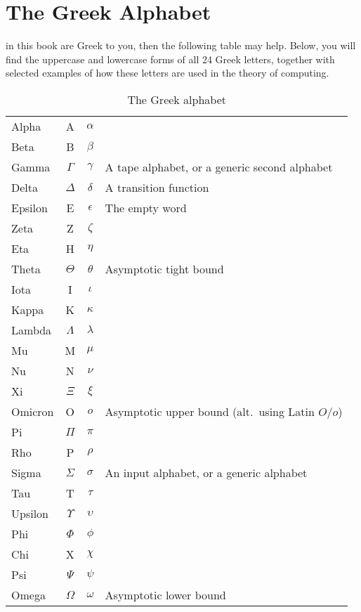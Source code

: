 \chapter{The Greek Alphabet}\label{app:greekalphabet}

 in this book are Greek to you, then the following table may help. Below, you will find the uppercase and lowercase forms of all 24 Greek letters, together with selected examples of how these letters are used in the theory of computing.

\begin{table}[h]
\centering
\caption{The Greek alphabet}
\begin{tabular}{l c c l}
\toprule
Alpha	& A			& $\alpha$	& \\
Beta		& B			& $\beta$		& \\
Gamma	& $\Gamma$	& $\gamma$	& A tape alphabet, or a generic second alphabet \\
Delta		& $\Delta$		& $\delta$		& A transition function \\
Epsilon	& E			& $\epsilon$	& The empty word \\
Zeta		& Z			& $\zeta$		& \\
Eta		& H			& $\eta$		& \\
Theta	& $\Theta$	& $\theta$		& Asymptotic tight bound \\
Iota		& I			& $\iota$		& \\
Kappa	& K			& $\kappa$	& \\
Lambda	& $\Lambda$	& $\lambda$	& \\
Mu		& M			& $\mu$		& \\
Nu		& N			& $\nu$		& \\
Xi		& $\Xi$		& $\xi$		& \\
Omicron	& O			& $o$		& Asymptotic upper bound (alt.\ using Latin $O$/$o$) \\
Pi		& $\Pi$		& $\pi$		& \\
Rho		& P			& $\rho$		& \\
Sigma	& $\Sigma$	& $\sigma$	& An input alphabet, or a generic alphabet \\
Tau		& T			& $\tau$		& \\
Upsilon	& $\Upsilon$	& $\upsilon$	& \\
Phi		& $\Phi$		& $\phi$		& \\
Chi		& X			& $\chi$		& \\
Psi		& $\Psi$		& $\psi$		& \\
Omega	& $\Omega$	& $\omega$	& Asymptotic lower bound \\
\bottomrule
\end{tabular}
\end{table}